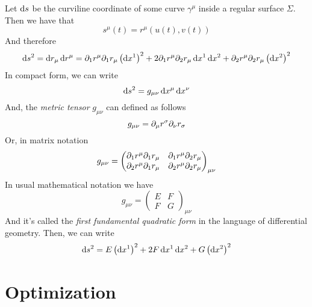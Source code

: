 \documentclass[../complete.tex]{subfiles}
\begin{document}
\begin{dfn}
	Let $\operatorname{d\!}{s}$ be the curviline coordinate of some curve $\gamma^\mu$ inside a regular surface $\Sigma$. Then we have that
	\begin{equation}
		s^\mu(t)=r^\mu(u(t),v(t))
		\label{eq:softsurf}
	\end{equation}
	And therefore
	\begin{equation}
		\operatorname{d\!}{s}^2=\operatorname{d\!}{r_\mu}\operatorname{d\!}{r^\mu}=\partial_1r^\mu\partial_1r_\mu\left(\operatorname{d\!}{x^1}\right)^2+2\partial_1r^\mu\partial_2r_\mu\operatorname{d\!}{x^1}\operatorname{d\!}{x^2}+\partial_2r^\mu\partial_2r_\mu\left( \operatorname{d\!}{x^2} \right)^2
		\label{eq:diffssurf}
	\end{equation}
	In compact form, we can write
	\begin{equation}
		\operatorname{d\!}{s}^2=g_{\mu\nu}\operatorname{d\!}{x^\mu}\operatorname{d\!}{x^\nu}
		\label{eq:metrictensorphys}
	\end{equation}
	And, the \textit{metric tensor} $g_{\mu\nu}$ can defined as follows
	\begin{equation}
		g_{\mu\nu}=\partial_\mu r^\sigma\partial_\nu r_\sigma
		\label{eq:metrictensor}
	\end{equation}
	Or, in matrix notation
	\begin{equation}
		g_{\mu\nu}=\begin{pmatrix}\partial_1r^\mu\partial_1r_\mu&\partial_1r^\mu\partial_2r_\mu\\\partial_2r^\mu\partial_1r_\mu&\partial_2r^\mu\partial_2r_\mu\end{pmatrix}_{\mu\nu}
		\label{eq:delmetrictensor}
	\end{equation}
	In usual mathematical notation we have
	\begin{equation}
		g_{\mu\nu}=\begin{pmatrix}E&F\\F&G\end{pmatrix}_{\mu\nu}
		\label{eq:metrictensro}
	\end{equation}
	And it's called the \textit{first fundamental quadratic form} in the language of differential geometry. Then, we can write
	\begin{equation}
		\operatorname{d\!}{s}^2=E\left(\operatorname{d\!}{x^1}\right)^2+2F\operatorname{d\!}{x^1}\operatorname{d\!}{x^2}+G\left(\operatorname{d\!}{x^2}\right)^2
		\label{eq:diffsfff}
	\end{equation}
\end{dfn}
\section{Optimization}
\end{document}
